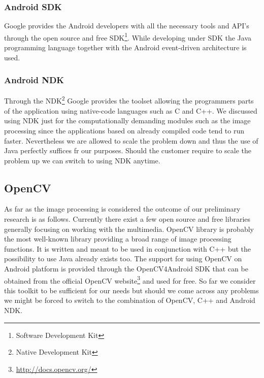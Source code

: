 \subsubsection{Android SDK}

Google provides the Android developers with all the necessary tools and API's through the open source and free SDK\footnote{Software Development Kit}. While developing under SDK the Java programming language together with the Android event-driven architecture is used.

\subsubsection{Android NDK}

Through the NDK\footnote{Native Development Kit} Google provides the toolset allowing the programmers parts of the application using native-code languages such as C and C++.
We discussed using NDK just for the computationally demanding modules such as the image processing since the applications based on already compiled code tend to run faster.
Nevertheless we are allowed to scale the problem down and thus the use of Java perfectly suffices fr our purposes.
Should the customer require to scale the problem up we can switch to using NDK anytime.


\subsection{OpenCV} \label{txt:image_processing_library}

As far as the image processing is considered the outcome of our preliminary research is as follows.
Currently there exist a few open source and free libraries generally focusing on working with the multimedia.
OpenCV library is probably the most well-known library providing a broad range of image processing functions.
It is written and meant to be used in conjunction with C++ but the possibility to use Java already exists too.
The support for using OpenCV on Android platform is provided through the OpenCV4Android SDK that can be obtained from the official OpenCV website\footnote{\url{http://docs.opencv.org/}} and used for free.
So far we consider this toolkit to be sufficient for our needs but should we come across any problems we might be forced to switch to the combination of OpenCV, C++ and Android NDK.


